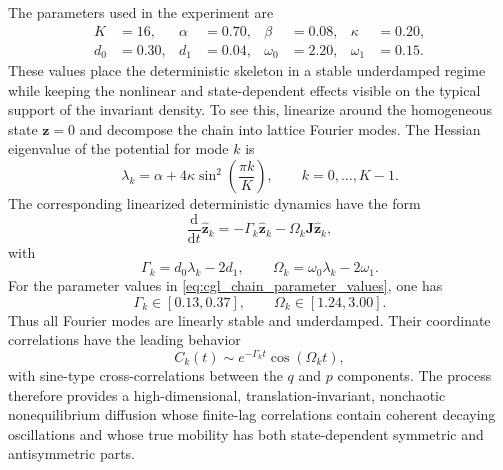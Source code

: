 \documentclass[11pt,twoside,fleqn]{article}
\renewcommand{\d}{\mathrm{d}}
\begin{document}
The parameters used in the experiment are
\begin{equation}
\begin{aligned}
    K &= 16,
    &
    \alpha &= 0.70,
    &
    \beta &= 0.08,
    &
    \kappa &= 0.20,
    \\
    d_0 &= 0.30,
    &
    d_1 &= 0.04,
    &
    \omega_0 &= 2.20,
    &
    \omega_1 &= 0.15.
\end{aligned}
    \label{eq:cgl_chain_parameter_values}
\end{equation}
These values place the deterministic skeleton in a stable underdamped regime while keeping the nonlinear and state-dependent effects visible on the typical support of the invariant density. To see this, linearize around the homogeneous state \(\bm{z}=0\) and decompose the chain into lattice Fourier modes. The Hessian eigenvalue of the potential for mode \(k\) is
\begin{equation}
    \lambda_k
    =
    \alpha
    +
    4\kappa
    \sin^2\left(\frac{\pi k}{K}\right),
    \qquad
    k=0,\ldots,K-1.
    \label{eq:cgl_chain_linear_potential_spectrum}
\end{equation}
The corresponding linearized deterministic dynamics have the form
\begin{equation}
    \frac{\d}{\d t}\widehat{\bm{z}}_k
    =
    -\Gamma_k\widehat{\bm{z}}_k
    -
    \Omega_k\bm{J}\widehat{\bm{z}}_k,
    \label{eq:cgl_chain_linearized_modes}
\end{equation}
with
\begin{equation}
    \Gamma_k
    =
    d_0\lambda_k-2d_1,
    \qquad
    \Omega_k
    =
    \omega_0\lambda_k-2\omega_1.
    \label{eq:cgl_chain_linear_damping_frequency}
\end{equation}
For the parameter values in \eqref{eq:cgl_chain_parameter_values}, one has
\[
    \Gamma_k\in[0.13,0.37],
    \qquad
    \Omega_k\in[1.24,3.00].
\]
Thus all Fourier modes are linearly stable and underdamped. Their coordinate correlations have the leading behavior
\begin{equation}
    C_k(t)
    \sim
    e^{-\Gamma_k t}\cos(\Omega_k t),
    \label{eq:cgl_chain_linear_acf}
\end{equation}
with sine-type cross-correlations between the \(q\) and \(p\) components. The process therefore provides a high-dimensional, translation-invariant, nonchaotic nonequilibrium diffusion whose finite-lag correlations contain coherent decaying oscillations and whose true mobility has both state-dependent symmetric and antisymmetric parts.
\end{document}
